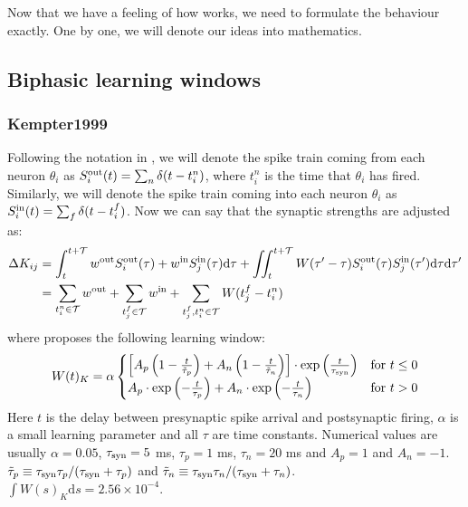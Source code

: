 Now that we have a feeling of how \STDP works, we need to formulate the behaviour exactly. One by one, we will denote our ideas into mathematics.


\subsection{Biphasic learning windows}

\subsubsection{Kempter1999}
Following the notation in \cite{Kempter1999}, we will denote the spike train coming from each neuron $\theta_i$ as $S_i^{\rm out}(t) = \sum_{n} \delta (t-t_{i}^{n})$, where $t_{i}^{n}$ is the time that $\theta_i$ has fired. Similarly, we will denote the spike train coming into each neuron $\theta_i$ as $S_i^{\rm in}(t) = \sum_{f} \delta (t-t_{i}^{f})$. Now we can say that the synaptic strengths are adjusted as:
\begin{align}
\Delta K_{ij} &= \int_{t}^{t+\mathcal{T}} w^{\rm{out}} S_i^{\rm out}(\tau) + w^{\rm{in}} S_{j}^{\rm {in}}(\tau) \mathrm{d}\tau
+ \iint_{t}^{t+\mathcal{T}} W( \tau^\prime - \tau) S_{i}^{\rm out}(\tau) S_{j}^{\rm in}( \tau^\prime) \mathrm{d} \tau \mathrm{d} \tau^\prime
\label{eq:KempterSTDPFormulation1} \\
&= \sum_{t_i^{n}\in \mathcal{T}} w^{\mathrm{out}} + \sum_{t_{j}^{f} \in \mathcal{T}} w^{\mathrm{in}} + \sum_{t_{j}^{f}, t_i^{n} \in \mathcal{T}} W (t_{j}^{f}-t_i^{n} ) \label{eq:KempterSTDPFormulation2}
\end{align}
where \cite{Kempter1999} proposes the following learning window:
\begin{align}
W(t)_K = \alpha
\begin{cases}
\left[A_{p}\left(1-\frac{t}{\tilde{\tau}_{p}}\right)+A_{n}\left(1-\frac{t}{\tilde{\tau}_{n}}\right)\right] \cdot \exp \left( \frac{t}{\tau_{\rm syn}} \right) & \text{for } t \leq 0 \\
A_{p} \cdot \exp \left(-\frac{t}{\tau_{p}}\right) + A_{n} \cdot \exp \left(-\frac{t}{\tau_{n}} \right) & \text{for } t > 0
\end{cases} \label{eq:learningwindowKempter1999}
\end{align}
Here $t$ is the delay between presynaptic spike arrival and postsynaptic firing, $\alpha$ is a small learning parameter and all $\tau$ are time constants. Numerical values are usually  $\alpha = 0.05$, $\tau_{\rm syn} = 5$ ms, $\tau_{p} = 1$ ms, $\tau_{n} = 20$ ms and $A_p = 1$ and $A_{n} = -1$. $\tilde{\tau}_{p} \equiv \tau_{\rm syn} \tau_{p} / (\tau_{\rm syn} + \tau_{p})$ and $\tilde{\tau}_{n} \equiv \tau_{\rm syn} \tau_{n} / (\tau_{\rm syn} + \tau_{n})$. \\
$\int W(s)_K \mathrm{d}s = 2.56 \times 10^{-4}$.


